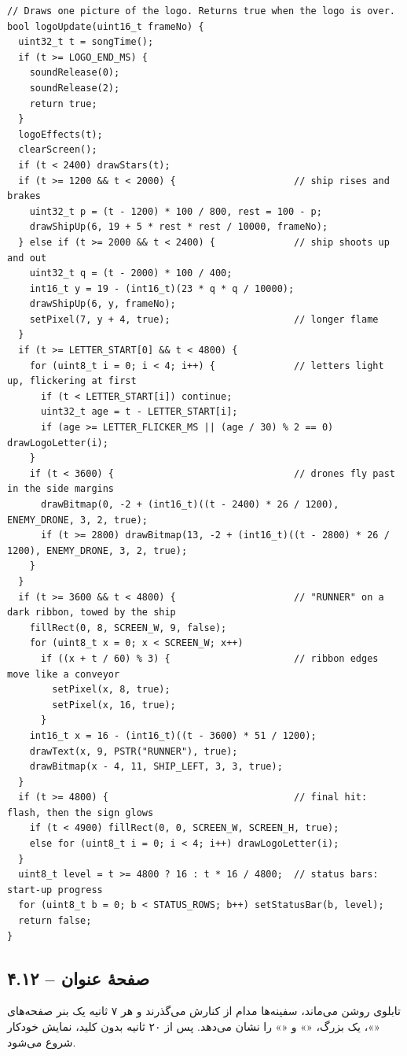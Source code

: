 \documentclass[11pt,a4paper]{article}
\begin{document}
\begin{latin}
\begin{lstlisting}[language=Arduino]
// Draws one picture of the logo. Returns true when the logo is over.
bool logoUpdate(uint16_t frameNo) {
  uint32_t t = songTime();
  if (t >= LOGO_END_MS) {
    soundRelease(0);
    soundRelease(2);
    return true;
  }
  logoEffects(t);
  clearScreen();
  if (t < 2400) drawStars(t);
  if (t >= 1200 && t < 2000) {                     // ship rises and brakes
    uint32_t p = (t - 1200) * 100 / 800, rest = 100 - p;
    drawShipUp(6, 19 + 5 * rest * rest / 10000, frameNo);
  } else if (t >= 2000 && t < 2400) {              // ship shoots up and out
    uint32_t q = (t - 2000) * 100 / 400;
    int16_t y = 19 - (int16_t)(23 * q * q / 10000);
    drawShipUp(6, y, frameNo);
    setPixel(7, y + 4, true);                      // longer flame
  }
  if (t >= LETTER_START[0] && t < 4800) {
    for (uint8_t i = 0; i < 4; i++) {              // letters light up, flickering at first
      if (t < LETTER_START[i]) continue;
      uint32_t age = t - LETTER_START[i];
      if (age >= LETTER_FLICKER_MS || (age / 30) % 2 == 0) drawLogoLetter(i);
    }
    if (t < 3600) {                                // drones fly past in the side margins
      drawBitmap(0, -2 + (int16_t)((t - 2400) * 26 / 1200), ENEMY_DRONE, 3, 2, true);
      if (t >= 2800) drawBitmap(13, -2 + (int16_t)((t - 2800) * 26 / 1200), ENEMY_DRONE, 3, 2, true);
    }
  }
  if (t >= 3600 && t < 4800) {                     // "RUNNER" on a dark ribbon, towed by the ship
    fillRect(0, 8, SCREEN_W, 9, false);
    for (uint8_t x = 0; x < SCREEN_W; x++)
      if ((x + t / 60) % 3) {                      // ribbon edges move like a conveyor
        setPixel(x, 8, true);
        setPixel(x, 16, true);
      }
    int16_t x = 16 - (int16_t)((t - 3600) * 51 / 1200);
    drawText(x, 9, PSTR("RUNNER"), true);
    drawBitmap(x - 4, 11, SHIP_LEFT, 3, 3, true);
  }
  if (t >= 4800) {                                 // final hit: flash, then the sign glows
    if (t < 4900) fillRect(0, 0, SCREEN_W, SCREEN_H, true);
    else for (uint8_t i = 0; i < 4; i++) drawLogoLetter(i);
  }
  uint8_t level = t >= 4800 ? 16 : t * 16 / 4800;  // status bars: start-up progress
  for (uint8_t b = 0; b < STATUS_ROWS; b++) setStatusBar(b, level);
  return false;
}
\end{lstlisting}

\end{latin}

\clearpage
\subsection*{۴.۱۲  – صفحهٔ عنوان}
تابلوی  روشن می‌ماند، سفینه‌ها مدام از کنارش می‌گذرند و هر ۷ ثانیه یک بنر صفحه‌های «»، یک  بزرگ، «» و «» را نشان می‌دهد. پس از ۲۰ ثانیه بدون کلید، نمایش خودکار شروع می‌شود.
\end{document}
